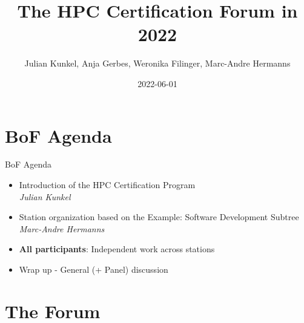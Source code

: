 \documentclass[compress,aspectratio=169]{beamer}
\subtitle{}
\title{\Large The HPC Certification Forum in 2022}
\author{Julian Kunkel, Anja Gerbes, Weronika Filinger, Marc-Andre Hermanns}
\date{2022-06-01}
\institute{Institute for Computer Science / GWDG}
\begin{document}
\begin{frame}[plain]{}
	\maketitle
\end{frame}



\section{BoF Agenda}

\begin{frame}{BoF Agenda}
  \begin{itemize}
    \item Introduction of the HPC Certification Program \\ \textit{Julian Kunkel}
    \item Station organization based on the Example: Software Development Subtree \\ \textit{Marc-Andre Hermanns}
    \item \textbf{All participants}: Independent work across stations
    \item Wrap up - General (+ Panel) discussion
  \end{itemize}
\end{frame}


\section{The Forum}
\sectionIntroHidden

\subsection{}
\end{document}
